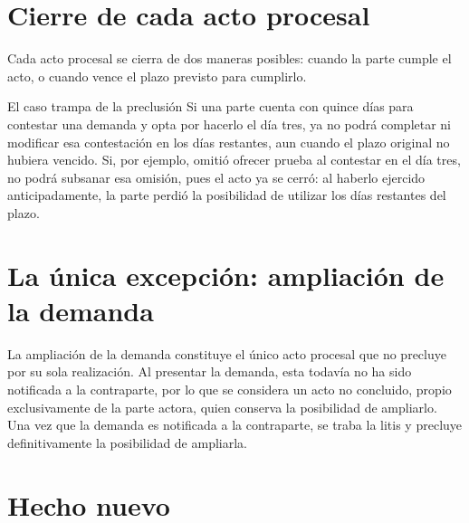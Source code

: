 \documentclass[12pt,oneside]{book}
\begin{document}
\section{Cierre de cada acto procesal}

Cada acto procesal se cierra de dos maneras posibles: cuando la parte cumple el acto, o cuando vence el plazo previsto para cumplirlo.

\begin{example}{El caso trampa de la preclusión}
Si una parte cuenta con quince días para contestar una demanda y opta por hacerlo el día tres, ya no podrá completar ni modificar esa contestación en los días restantes, aun cuando el plazo original no hubiera vencido. Si, por ejemplo, omitió ofrecer prueba al contestar en el día tres, no podrá subsanar esa omisión, pues el acto ya se cerró: al haberlo ejercido anticipadamente, la parte perdió la posibilidad de utilizar los días restantes del plazo.
\end{example}

\section{La única excepción: ampliación de la demanda}

\begin{important}
La ampliación de la demanda constituye el único acto procesal que no precluye por su sola realización. Al presentar la demanda, esta todavía no ha sido notificada a la contraparte, por lo que se considera un acto no concluido, propio exclusivamente de la parte actora, quien conserva la posibilidad de ampliarlo. Una vez que la demanda es notificada a la contraparte, se traba la litis y precluye definitivamente la posibilidad de ampliarla.
\end{important}

\section{Hecho nuevo}
\end{document}

